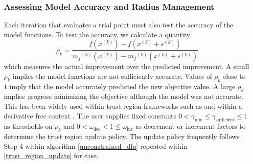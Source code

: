 \documentclass{article}
\theoremstyle{case}
\newcommand{\modelk}{{{m}_f}^{(k)}}
\newcommand{\iteratek}{{x}^{(k)}}
\newcommand{\trialk}{{{s}^{(k)}}}
\newcommand{\feasiblek}{{F}^{(k)}}
\newcommand{\chik}{{\chi^{(k)}}}
\newcommand{\gammasm}{\gamma_{\text{min}}}
\newcommand{\gammabi}{\gamma_{\text{sufficient}}}
\begin{document}


\subsubsection{Assessing Model Accuracy and Radius Management}

Each iteration that evaluates a trial point must also test the accuracy of the model functions.
To test the accuracy, we calculate a quantity
\begin{equation}
\label{rho}
\rho_k = \frac{f(\iteratek) - f(\iteratek+\trialk)}{\modelk(\iteratek) - \modelk(\iteratek+\trialk)}
\end{equation}
which measures the actual improvement over the predicted improvement.
A small $\rho_k$ implies the model functions are not sufficiently accurate.
Values of $\rho_k$ close to $1$ imply that the model accurately predicted the new objective value.
A large $\rho_k$ implies progress minimizing the objective although the model was not accurate.
This has been widely used within trust region frameworks such as \cite{Conn:2000:TM:357813} and within a derivative free context \cite{DUMMY:intro_book}.
The user supplies fixed constants $0 < \gammasm \le \gammabi \le 1$ as thresholds on $\rho_k$ and $0 < \omega_{\text{dec}} < 1 \le \omega_{\text{inc}}$ as decrement or increment factors to determine the trust region update policy.
The update policy frequently follows Step 4 within algorithm \cref{unconstrained_dfo} repeated within \cref{trust_region_update} for ease.
\end{document}
